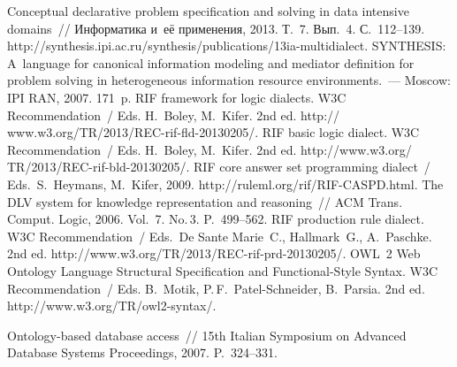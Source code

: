 

\vspace*{6pt}


 \begin{multicols}{2}

\renewcommand{\bibname}{\protect\rmfamily Литература}

{\small\frenchspacing
{%
\begin{thebibliography}{99}

Conceptual declarative problem specification and solving in data intensive domains~//
Информатика и~её применения, 2013. Т.~7. Вып.~4. С.~112--139.
{\sf http://synthesis.ipi.ac.ru/synthesis/publications/13ia-multidialect}.
 SYNTHESIS: A~language for canonical information modeling and mediator definition
 for problem solving in heterogeneous information resource environments.~---
 Moscow: IPI RAN, 2007. 171~p.
RIF framework for logic dialects. W3C Recommendation~/
Eds. H.~Boley, M.~Kifer. 2nd ed.
{\sf http:// www.w3.org/TR/2013/REC-rif-fld-20130205/}.
RIF basic logic dialect. W3C Recommendation~/
Eds. H.~Boley, M.~Kifer. 2nd ed.
{\sf http://www.w3.org/ TR/2013/REC-rif-bld-20130205/}.
RIF core answer set programming dialect~/
Eds.\ S.~Heymans, M.~Kifer, 2009. {\sf  http://ruleml.org/rif/RIF-CASPD.html}.
The DLV system for knowledge representation and reasoning~//
 ACM Trans. Comput. Logic, 2006. Vol.~7. No.\,3. P.~499--562.
RIF production rule dialect. W3C Recommendation~/
Eds.\ De Sante Marie~C., Hallmark~G., A.~Paschke.~ 2nd ed.
{\sf http://www.w3.org/TR/2013/REC-rif-prd-20130205/}.
OWL~2 Web Ontology Language Structural Specification and Functional-Style Syntax.
W3C Recommendation~/ Eds. B.~Motik, P.\,F.~Patel-Schneider, B.~Parsia. 2nd ed.
{\sf http://www.w3.org/TR/owl2-syntax/}.

Ontology-based database access~// 15th Italian Symposium on Advanced
Database Systems Proceedings, 2007. P.~324--331.


\end{thebibliography}}}
\end{multicols}
